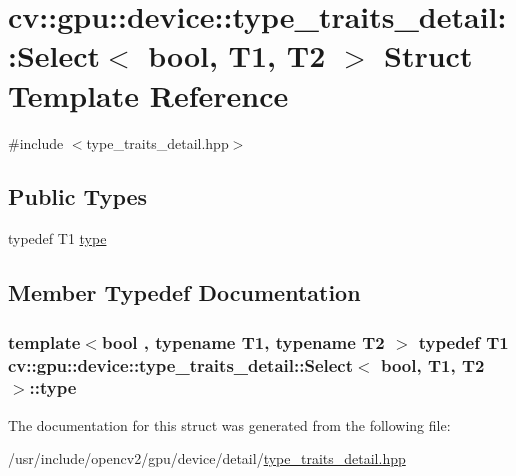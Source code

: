 \hypertarget{structcv_1_1gpu_1_1device_1_1type__traits__detail_1_1Select}{\section{cv\-:\-:gpu\-:\-:device\-:\-:type\-\_\-traits\-\_\-detail\-:\-:Select$<$ bool, T1, T2 $>$ Struct Template Reference}
\label{structcv_1_1gpu_1_1device_1_1type__traits__detail_1_1Select}
}


{\ttfamily \#include $<$type\-\_\-traits\-\_\-detail.\-hpp$>$}

\subsection*{Public Types}
\begin{DoxyCompactItemize}
\item 
typedef T1 \hyperlink{structcv_1_1gpu_1_1device_1_1type__traits__detail_1_1Select_a9ebc35df3b6811113e11957fd040bc9a}{type}
\end{DoxyCompactItemize}


\subsection{Member Typedef Documentation}
\hypertarget{structcv_1_1gpu_1_1device_1_1type__traits__detail_1_1Select_a9ebc35df3b6811113e11957fd040bc9a}{
\subsubsection[{type}]{\setlength{\rightskip}{0pt plus 5cm}template$<$bool , typename T1, typename T2 $>$ typedef T1 {\bf cv\-::gpu\-::device\-::type\-\_\-traits\-\_\-detail\-::\-Select}$<$ bool, T1, T2 $>$\-::{\bf type}}}\label{structcv_1_1gpu_1_1device_1_1type__traits__detail_1_1Select_a9ebc35df3b6811113e11957fd040bc9a}


The documentation for this struct was generated from the following file\-:\begin{DoxyCompactItemize}
\item 
/usr/include/opencv2/gpu/device/detail/\hyperlink{type__traits__detail_8hpp}{type\-\_\-traits\-\_\-detail.\-hpp}\end{DoxyCompactItemize}
